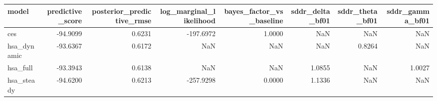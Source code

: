 \begin{tabular}{lrrrrrrr}
\toprule
model & predictive\_score & posterior\_predictive\_rmse & log\_marginal\_likelihood & bayes\_factor\_vs\_baseline & sddr\_delta\_bf01 & sddr\_theta\_bf01 & sddr\_gamma\_bf01 \\
\midrule
ces & -94.9099 & 0.6231 & -197.6972 & 1.0000 & NaN & NaN & NaN \\
hsa\_dynamic & -93.6367 & 0.6172 & NaN & NaN & NaN & 0.8264 & NaN \\
hsa\_full & -93.3943 & 0.6138 & NaN & NaN & 1.0855 & NaN & 1.0027 \\
hsa\_steady & -94.6200 & 0.6213 & -257.9298 & 0.0000 & 1.1336 & NaN & NaN \\
\bottomrule
\end{tabular}
